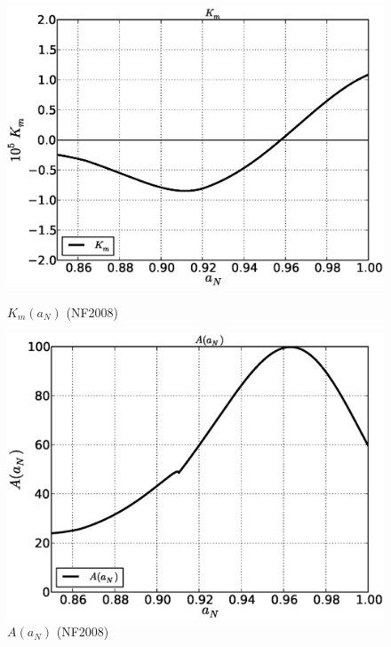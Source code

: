 \documentclass[11pt,oneside,a4paper,notitlepage]{article}
\begin{document}
\begin{figure}[h]
\begin{center}
 \begin{minipage}[h]{0.4\linewidth}
  \includegraphics[width=1.35\linewidth]{Km.eps}
  \caption{$K_m(a_N)$ (NF2008)}
  \label{fig:km}
 \end{minipage}
 \hfill
 \begin{minipage}[h]{0.4\linewidth}
  \includegraphics[width=1.35\linewidth]{A.eps}
  \caption{$A(a_N)$ (NF2008)}
  \label{fig:A}
 \end{minipage}  
\end{center}
\end{figure}
\end{document}

